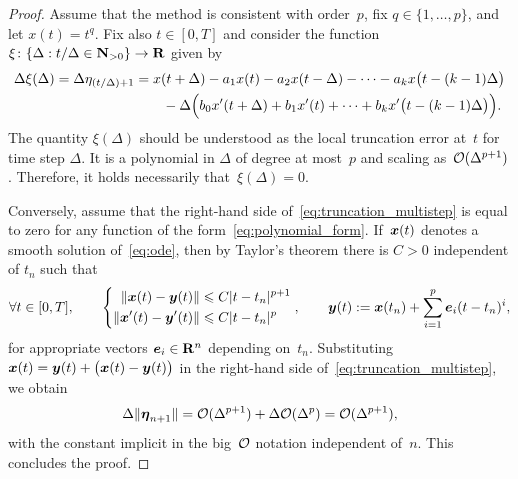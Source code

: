 \begin{proof}
    Assume that the method is consistent with order~$p$, fix $q \in \{1, \dotsc, p\}$,
    and let $x(t) = t^{q}$.
    Fix also $t \in [0, T]$ and consider the function $\xi\colon \{\Delta : t/\Delta \in \mathbf N_{> 0}\} \to \mathbf R$ given by
    \begin{align*}
        \nonumber
        \Delta \xi(\Delta) = \Delta \eta_{(t/\Delta) +1}
            &= x(t + \Delta) - a_1 x(t) - a_2 x(t - \Delta) - \dotsb - a_k x\bigl(t - (k-1) \Delta\bigr) \\
            & \qquad- \Delta \Bigl( b_0 x'(t + \Delta) + b_1 x'(t) + \dotsb + b_k x'\bigl(t - (k-1) \Delta\bigr) \Bigr).
    \end{align*}
    The quantity $\xi(\Delta)$ should be understood as the local truncation error at~$t$ for time step $\Delta$.
    It is a polynomial in $\Delta$ of degree at most~$p$ and scaling as~$\mathcal O(\Delta^{p+1})$.
    Therefore, it holds necessarily that~$\xi(\Delta) = 0$.

    Conversely, assume that the right-hand side of~\eqref{eq:truncation_multistep} is equal to zero for any function of the form~\eqref{eq:polynomial_form}.
    If~$\mathbf{\boldsymbol{x}}(t)$ denotes a smooth solution of~\eqref{eq:ode},
    then by Taylor's theorem there is $C > 0$ independent of $t_n$ such that
    \[
        \forall t \in [0, T], \qquad
        \left\{
        \begin{aligned}
            \lVert\mathbf{\boldsymbol{x}}(t) - \mathbf{\boldsymbol{y}}(t)\rVert &\leqslant C|t-t_n|^{p+1} \\
            \lVert\mathbf{\boldsymbol{x}}'(t) - \mathbf{\boldsymbol{y}}'(t)\rVert &\leqslant C|t-t_n|^{p}
        \end{aligned}
        \right. ,
        \qquad
        \mathbf{\boldsymbol{y}}(t) := \mathbf{\boldsymbol{x}}(t_n) + \sum_{i=1}^{p} \mathbf{\boldsymbol{e}}_i (t-t_n)^i,
    \]
    for appropriate vectors $\mathbf{\boldsymbol{e}}_i \in \mathbf R^n$ depending on~$t_n$.
    Substituting $\mathbf{\boldsymbol{x}}(t) = \mathbf{\boldsymbol{y}}(t) + \bigl(\mathbf{\boldsymbol{x}}(t) - \mathbf{\boldsymbol{y}}(t)\bigr)$ in the right-hand side of~\eqref{eq:truncation_multistep},
    we obtain
    \[
        \Delta \lVert\mathbf{\boldsymbol{\eta}}_{n+1}\rVert = \mathcal O(\Delta^{p+1}) + \Delta \mathcal O(\Delta^p) = \mathcal O(\Delta^{p+1}),
    \]
    with the constant implicit in the big~$\mathcal O$ notation independent of~$n$.
    This concludes the proof.
\end{proof}
